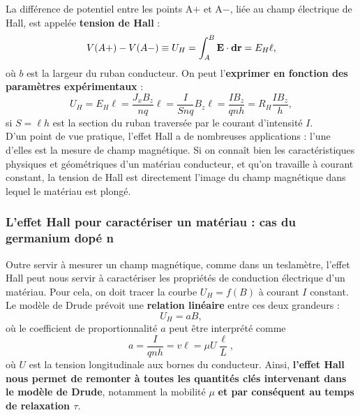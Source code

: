\documentclass[11pt,a4paper]{report}
\begin{document}
La différence de potentiel entre les points A$+$ et A$-$, liée au champ électrique de Hall, est appelée \textbf{tension de Hall} :\\
\begin{equation}
	V(A+) - V(A-) \equiv U_H = \int_A^B \bold{E}\cdot\bold{dr} = E_H \ell,
\end{equation}
où $b$ est la largeur du ruban conducteur. On peut l'\textbf{exprimer en fonction des paramètres expérimentaux} :
\begin{equation}
	U_H = E_H \ell = \frac{J_x B_z}{nq}\ell = \frac{I}{Snq}B_z \ell = \frac{I B_z}{q n h} = R_H \frac{I B_z}{h},
\end{equation}
si $S = \ell h$ est la section du ruban traversée par le courant d'intensité $I$.\\

D'un point de vue pratique, l'effet Hall a de nombreuses applications : l'une d'elles est la mesure de champ magnétique. Si on connaît bien les caractéristiques physiques et géométriques d'un matériau conducteur, et qu'on travaille à courant constant, la tension de Hall est directement l'image du champ magnétique dans lequel le matériau est plongé.\\

\subsubsection{L'effet Hall pour caractériser un matériau : cas du germanium dopé n}

Outre servir à mesurer un champ magnétique, comme dans un teslamètre, l'effet Hall peut nous servir à caractériser les propriétés de conduction électrique d'un matériau. Pour cela, on doit tracer la courbe $U_H = f(B)$ à courant $I$ constant. Le modèle de Drude prévoit une \textbf{relation linéaire} entre ces deux grandeurs :
\begin{equation}
	U_H = a B,
\end{equation}
où le coefficient de proportionnalité $a$ peut être interprété comme
\begin{equation}
	\boxed{a = \frac{I}{q n h} = v \ell = \mu U \frac{\ell}{L}},
\end{equation}
où $U$ est la tension longitudinale aux bornes du conducteur. Ainsi, \textbf{l'effet Hall nous permet de remonter à toutes les quantités clés intervenant dans le modèle de Drude}, notamment la mobilité $\mu$ \textbf{et par conséquent au temps de relaxation $\tau$}.\\ 
\end{document}

